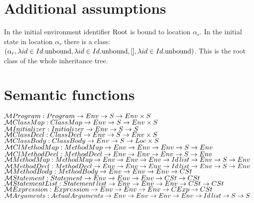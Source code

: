 \documentclass[11pt,a4paper,twoside]{article}
\begin{document}
\section{Additional assumptions}
In the initial environment identifier $\mathrm{Root}$ is bound to location $\alpha_{r}$. In the initial state in location $\alpha_{r}$ there is a class: $(\alpha_{r}, \lambda id\in Id.\mathrm{unbound}, \lambda id\in Id.\mathrm{unbound}, [], \lambda id\in Id.\mathrm{unbound})$. This is the root class of the whole inheritance tree.

\section{Semantic functions}
$\;$\\
$\mathcal{M} Program: Program\rightarrow Env\rightarrow S\rightarrow Env\times S$\\
$\mathcal{M} ClassMap: ClassMap\rightarrow Env\rightarrow S\rightarrow Env\times S$\\
$\mathcal{M} Initializer: Initializer\rightarrow Env\rightarrow S\rightarrow S$\\
$\mathcal{M} ClassDecl: ClassDecl\rightarrow Env\rightarrow S\rightarrow Env\times S$\\
$\mathcal{M} ClassBody: ClassBody\rightarrow Env\rightarrow S\rightarrow Loc\times S$\\
$\mathcal{M} ClMethodMap: MethodMap\rightarrow Env\rightarrow Env\rightarrow Env\rightarrow S\rightarrow Env$\\
$\mathcal{M} ClMethodDecl: MethodDecl\rightarrow Env\rightarrow Env\rightarrow Env\rightarrow S\rightarrow Env$\\
$\mathcal{M} MethodMap: MethodMap\rightarrow Env\rightarrow Env\rightarrow Env\rightarrow Id\,list\rightarrow Env\rightarrow S\rightarrow Env$\\
$\mathcal{M} MethodDecl: MethodDecl\rightarrow Env\rightarrow Env\rightarrow Env\rightarrow Id\,list\rightarrow Env\rightarrow S\rightarrow Env$\\
$\mathcal{M} MethodBody: MethodBody\rightarrow Env\rightarrow Env\rightarrow Env\rightarrow CSt$\\
$\mathcal{M} Statement: Statement\rightarrow Env\rightarrow Env\rightarrow Env\rightarrow CSt\rightarrow CSt$\\
$\mathcal{M} StatementList: Statement\,list\rightarrow Env\rightarrow Env\rightarrow Env\rightarrow CSt\rightarrow CSt$\\
$\mathcal{M} Expression: Expression\rightarrow Env\rightarrow Env\rightarrow Env\rightarrow CExp\rightarrow CSt$\\
$\mathcal{M} Arguments: ActualArguments\rightarrow Env\rightarrow Env\rightarrow Env\rightarrow Env\rightarrow Id\,list\rightarrow S\rightarrow S$\\
\end{document}
